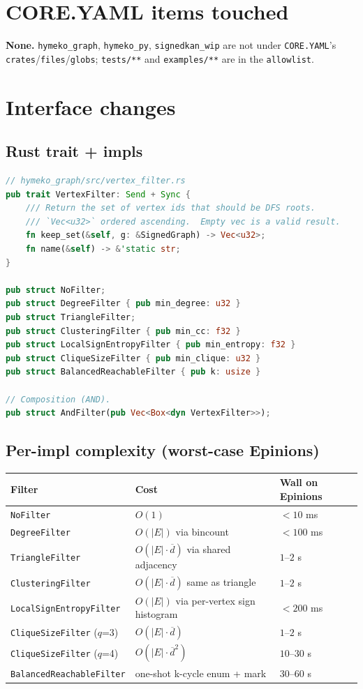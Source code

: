 \documentclass[11pt,a4paper]{article}
\begin{document}
\section{CORE.YAML items touched}
\textbf{None.}  \texttt{hymeko\_graph}, \texttt{hymeko\_py},
\texttt{signedkan\_wip} are not under \texttt{CORE.YAML}'s
\texttt{crates}/\texttt{files}/\texttt{globs}; \texttt{tests/**} and
\texttt{examples/**} are in the \texttt{allowlist}.

\section{Interface changes}

\subsection*{Rust trait + impls}
\begin{lstlisting}[language=rust]
// hymeko_graph/src/vertex_filter.rs
pub trait VertexFilter: Send + Sync {
    /// Return the set of vertex ids that should be DFS roots.
    /// `Vec<u32>` ordered ascending.  Empty vec is a valid result.
    fn keep_set(&self, g: &SignedGraph) -> Vec<u32>;
    fn name(&self) -> &'static str;
}

pub struct NoFilter;
pub struct DegreeFilter { pub min_degree: u32 }
pub struct TriangleFilter;
pub struct ClusteringFilter { pub min_cc: f32 }
pub struct LocalSignEntropyFilter { pub min_entropy: f32 }
pub struct CliqueSizeFilter { pub min_clique: u32 }
pub struct BalancedReachableFilter { pub k: usize }

// Composition (AND).
pub struct AndFilter(pub Vec<Box<dyn VertexFilter>>);
\end{lstlisting}

\subsection*{Per-impl complexity (worst-case Epinions)}
\begin{tabular}{lll}
\toprule
Filter & Cost & Wall on Epinions \\
\midrule
\texttt{NoFilter} & $O(1)$ & $<10$ ms \\
\texttt{DegreeFilter} & $O(|E|)$ via bincount & $<100$ ms \\
\texttt{TriangleFilter} & $O(|E| \cdot \overline{d})$ via shared adjacency & $1$--$2$ s \\
\texttt{ClusteringFilter} & $O(|E| \cdot \overline{d})$ same as triangle & $1$--$2$ s \\
\texttt{LocalSignEntropyFilter} & $O(|E|)$ via per-vertex sign histogram & $<200$ ms \\
\texttt{CliqueSizeFilter} ($q$=3) & $O(|E| \cdot \overline{d})$ & $1$--$2$ s \\
\texttt{CliqueSizeFilter} ($q$=4) & $O(|E| \cdot \overline{d}^2)$ & $10$--$30$ s \\
\texttt{BalancedReachableFilter} & one-shot k-cycle enum + mark & $30$--$60$ s \\
\bottomrule
\end{tabular}
\end{document}
